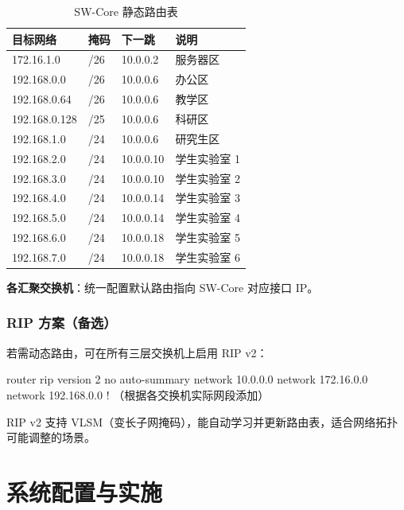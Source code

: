 \documentclass[12pt,a4paper]{ctexart}
\begin{document}
\begin{table}[H]
\centering
\caption{SW-Core 静态路由表}
\begin{tabular}{llll}
\toprule
\textbf{目标网络} & \textbf{掩码} & \textbf{下一跳} & \textbf{说明} \\
\midrule
172.16.1.0   & /26 & 10.0.0.2  & 服务器区 \\
192.168.0.0  & /26 & 10.0.0.6  & 办公区 \\
192.168.0.64 & /26 & 10.0.0.6  & 教学区 \\
192.168.0.128& /25 & 10.0.0.6  & 科研区 \\
192.168.1.0  & /24 & 10.0.0.6  & 研究生区 \\
192.168.2.0  & /24 & 10.0.0.10 & 学生实验室 1 \\
192.168.3.0  & /24 & 10.0.0.10 & 学生实验室 2 \\
192.168.4.0  & /24 & 10.0.0.14 & 学生实验室 3 \\
192.168.5.0  & /24 & 10.0.0.14 & 学生实验室 4 \\
192.168.6.0  & /24 & 10.0.0.18 & 学生实验室 5 \\
192.168.7.0  & /24 & 10.0.0.18 & 学生实验室 6 \\
\bottomrule
\end{tabular}
\end{table}

\textbf{各汇聚交换机}：统一配置默认路由指向 SW-Core 对应接口 IP。

\subsubsection{RIP 方案（备选）}

若需动态路由，可在所有三层交换机上启用 RIP v2：

\begin{codeblock}
router rip
 version 2
 no auto-summary
 network 10.0.0.0
 network 172.16.0.0
 network 192.168.0.0
 ! （根据各交换机实际网段添加）
\end{codeblock}

RIP v2 支持 VLSM（变长子网掩码），能自动学习并更新路由表，适合网络拓扑可能调整的场景。

\section{系统配置与实施}
\end{document}
